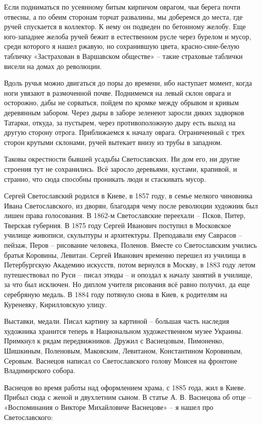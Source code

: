 Если подниматься по усеянному битым кирпичом оврагом, чьи берега почти отвесны, а по обеим сторонам торчат развалины, мы доберемся до места, где ручей спускается в коллектор. К нему он подведен по бетонному желобу. Еще юго-западнее желоба ручей бежит в естественном русле через бурелом и мусор, среди которого я нашел ржавую, но сохранившую цвета, красно-сине-белую табличку «Застрахован в Варшавском обществе» – такие страховые таблички висели на домах до революции. 

Вдоль ручья можно двигаться до поры до времени, ибо наступает момент, когда ноги увязают в размоченной почве. Поднимемся на левый склон оврага и осторожно, дабы не сорваться, пойдем по кромке между обрывом и кривым деревянным забором. Через дыры в заборе зеленеют заросли диких задворков Татарки, откуда, за пустырем, через противоположную дыру есть выход на другую сторону отрога. Приближаемся к началу оврага. Ограниченный с трех сторон крутыми склонами, ручей вытекает внизу из трубы в западном.

Таковы окрестности бывшей усадьбы Светославских. Ни дом его, ни другие строения тут не сохранились. Всё заросло деревьями, кустами, крапивой, и странно, что сюда способны проникать люди и стаскивать мусор.

Сергей Светославский родился в Киеве, в 1857 году, в семье мелкого чиновника Ивана Светославского, из дворян, благодаря чему после революции художник был лишен права голосования. В 1862-м Светославские переехали – Псков, Питер, Тверская губерния. В 1875 году Сергей Иванович поступил в Московское училище живописи, скульптуры и архитектуры. Преподавали ему Саврасов – пейзаж, Перов – рисование человека, Поленов. Вместе со Светославским учились братья Коровины, Левитан. Сергей Иванович временно перешел из училища в Петербургскую Академию искусств, потом вернулся в Москву, в 1883 году летом путешествовал по Руси – писал этюды – и опоздал к началу занятий в училище, за что был исключен. Но диплом учителя рисования всё равно получил, да еще серебряную медаль. В 1884 году потянуло снова в Киев, к родителям на Куреневку, Кирилловскую улицу. 

Выставки, медали. Писал картину за картиной –  большая часть наследия художника хранится теперь в Национальном художественном музее Украины. Примкнул к рядам передвижников. Дружил с Васнецовым, Пимоненко, Шишкиным, Поленовым, Маковским, Левитаном, Константином Коровиным, Серовым. Васнецов написал со Светославского голову Моисея на фронтоне Владимирского собора.

Васнецов во время работы над оформлением храма, с 1885 года, жил в Киеве. Прибыл сюда с женой и двухлетним сыном. В статье А. В. Васнецова об отце – «Воспоминания о Викторе Михайловиче Васнецове» – я нашел про Светославского:

